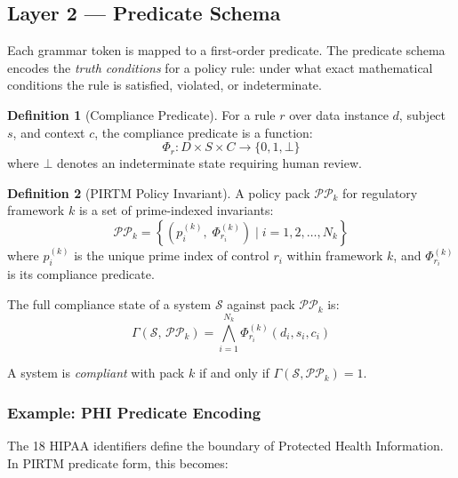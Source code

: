 \documentclass[12pt,letterpaper]{article}
\theoremstyle{definition}
\newtheorem{definition}{Definition}[section]
\theoremstyle{plain}
\theoremstyle{remark}
\begin{document}
\subsection{Layer 2 --- Predicate Schema}

Each grammar token is mapped to a first-order predicate. The predicate schema
encodes the \emph{truth conditions} for a policy rule: under what exact
mathematical conditions the rule is satisfied, violated, or indeterminate.

\begin{definition}[Compliance Predicate]
For a rule $r$ over data instance $d$, subject $s$, and context $c$, the
compliance predicate is a function:
\begin{equation}
\Phi_r : D \times S \times C \rightarrow \{0, 1, \bot\}
\label{eq:complpred}
\end{equation}
where $\bot$ denotes an indeterminate state requiring human review.
\end{definition}

\begin{definition}[PIRTM Policy Invariant]
A policy pack $\mathcal{PP}_k$ for regulatory framework $k$ is a set of
prime-indexed invariants:
\begin{equation}
\mathcal{PP}_k = \left\{ \left( p_i^{(k)},\; \Phi_{r_i}^{(k)} \right) \mid
  i = 1, 2, \ldots, N_k \right\}
\label{eq:packdef}
\end{equation}
where $p_i^{(k)}$ is the unique prime index of control $r_i$ within framework
$k$, and $\Phi_{r_i}^{(k)}$ is its compliance predicate.
\end{definition}

The full compliance state of a system $\mathcal{S}$ against pack
$\mathcal{PP}_k$ is:
\begin{equation}
\Gamma(\mathcal{S},\, \mathcal{PP}_k) =
  \bigwedge_{i=1}^{N_k} \Phi_{r_i}^{(k)}(d_i, s_i, c_i)
\label{eq:compliancestate}
\end{equation}

A system is \emph{compliant} with pack $k$ if and only if
$\Gamma(\mathcal{S}, \mathcal{PP}_k) = 1$.

\subsubsection{Example: PHI Predicate Encoding}

The 18 HIPAA identifiers define the boundary of Protected Health Information.
In PIRTM predicate form, this becomes:
\end{document}
